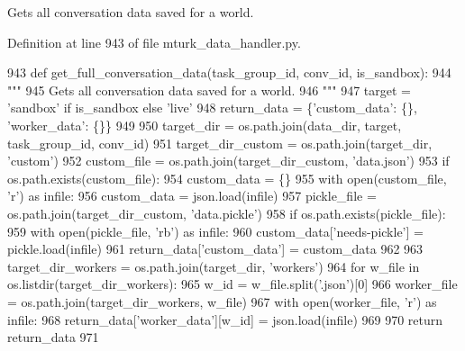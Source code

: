 \begin{DoxyVerb}Gets all conversation data saved for a world.
\end{DoxyVerb}
 

Definition at line 943 of file mturk\+\_\+data\+\_\+handler.\+py.


\begin{DoxyCode}
943     \textcolor{keyword}{def }get\_full\_conversation\_data(task\_group\_id, conv\_id, is\_sandbox):
944         \textcolor{stringliteral}{"""}
945 \textcolor{stringliteral}{        Gets all conversation data saved for a world.}
946 \textcolor{stringliteral}{        """}
947         target = \textcolor{stringliteral}{'sandbox'} \textcolor{keywordflow}{if} is\_sandbox \textcolor{keywordflow}{else} \textcolor{stringliteral}{'live'}
948         return\_data = \{\textcolor{stringliteral}{'custom\_data'}: \{\}, \textcolor{stringliteral}{'worker\_data'}: \{\}\}
949 
950         target\_dir = os.path.join(data\_dir, target, task\_group\_id, conv\_id)
951         target\_dir\_custom = os.path.join(target\_dir, \textcolor{stringliteral}{'custom'})
952         custom\_file = os.path.join(target\_dir\_custom, \textcolor{stringliteral}{'data.json'})
953         \textcolor{keywordflow}{if} os.path.exists(custom\_file):
954             custom\_data = \{\}
955             with open(custom\_file, \textcolor{stringliteral}{'r') as infile:}
956 \textcolor{stringliteral}{                custom\_data = json.load(infile)}
957 \textcolor{stringliteral}{            pickle\_file = os.path.join(target\_dir\_custom, 'data.pickle'})
958             \textcolor{keywordflow}{if} os.path.exists(pickle\_file):
959                 with open(pickle\_file, \textcolor{stringliteral}{'rb'}) \textcolor{keyword}{as} infile:
960                     custom\_data[\textcolor{stringliteral}{'needs-pickle'}] = pickle.load(infile)
961             return\_data[\textcolor{stringliteral}{'custom\_data'}] = custom\_data
962 
963         target\_dir\_workers = os.path.join(target\_dir, \textcolor{stringliteral}{'workers'})
964         \textcolor{keywordflow}{for} w\_file \textcolor{keywordflow}{in} os.listdir(target\_dir\_workers):
965             w\_id = w\_file.split(\textcolor{stringliteral}{'.json'})[0]
966             worker\_file = os.path.join(target\_dir\_workers, w\_file)
967             with open(worker\_file, \textcolor{stringliteral}{'r') as infile:}
968 \textcolor{stringliteral}{                return\_data['worker\_data'}][w\_id] = json.load(infile)
969 
970         \textcolor{keywordflow}{return} return\_data
971 \end{DoxyCode}
